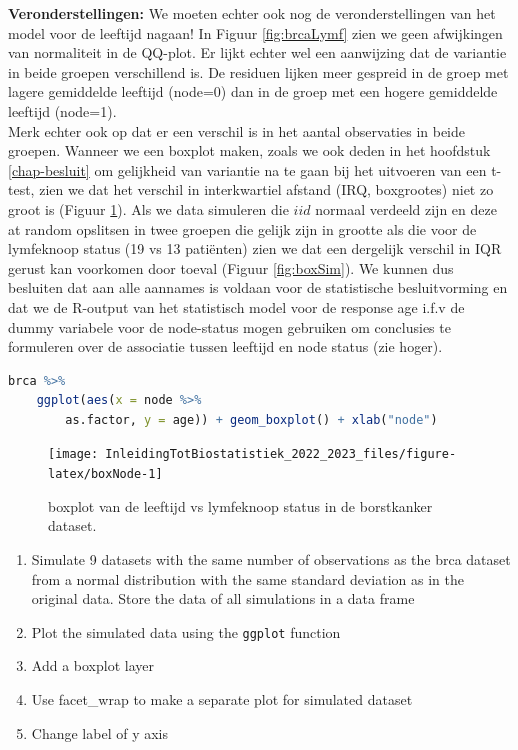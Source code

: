 \documentclass[
  12pt,dutch,coursenotes]{book}
\newcommand{\passthrough}[1]{#1}
\providecommand{\tightlist}{%
  \setlength{\itemsep}{0pt}\setlength{\parskip}{0pt}}
\begin{document}
\textbf{Veronderstellingen:} We moeten echter ook nog de veronderstellingen van het model voor de leeftijd nagaan! In Figuur \ref{fig:brcaLymf} zien we geen afwijkingen van normaliteit in de QQ-plot.
Er lijkt echter wel een aanwijzing dat de variantie in beide groepen verschillend is. De residuen lijken meer gespreid in de groep met lagere gemiddelde leeftijd (node=0) dan in de groep met een hogere gemiddelde leeftijd (node=1).\\
Merk echter ook op dat er een verschil is in het aantal observaties in beide groepen.
Wanneer we een boxplot maken, zoals we ook deden in het hoofdstuk \ref{chap-besluit} om gelijkheid van variantie na te gaan bij het uitvoeren van een t-test, zien we dat het verschil in interkwartiel afstand (IRQ, boxgrootes) niet zo groot is (Figuur \ref{fig:boxNode}).
Als we data simuleren die \(iid\) normaal verdeeld zijn en deze at random opslitsen in twee groepen die gelijk zijn in grootte als die voor de lymfeknoop status (19 vs 13 patiënten) zien we dat een dergelijk verschil in IQR gerust kan voorkomen door toeval (Figuur \ref{fig:boxSim}).
We kunnen dus besluiten dat aan alle aannames is voldaan voor de statistische besluitvorming en dat we de R-output van het statistisch model voor de response age i.f.v de dummy variabele voor de node-status mogen gebruiken om conclusies te formuleren over de associatie tussen leeftijd en node status (zie hoger).

\begin{lstlisting}[language=R]
brca %>%
    ggplot(aes(x = node %>%
        as.factor, y = age)) + geom_boxplot() + xlab("node")
\end{lstlisting}

\begin{figure}

{\centering \texttt{[image: InleidingTotBiostatistiek\_2022\_2023\_files/figure-latex/boxNode-1]} 

}

\caption{boxplot van de leeftijd vs lymfeknoop status in de borstkanker dataset.}\label{fig:boxNode}
\end{figure}

\begin{enumerate}
\def\labelenumi{\arabic{enumi}.}
\tightlist
\item
  Simulate 9 datasets with the same number of observations as the brca dataset from a normal distribution with the same standard deviation as in the original data. Store the data of all simulations in a data frame
\item
  Plot the simulated data using the \passthrough{\lstinline!ggplot!} function
\item
  Add a boxplot layer
\item
  Use facet\_wrap to make a separate plot for simulated dataset
\item
  Change label of y axis
\end{enumerate}
\end{document}
